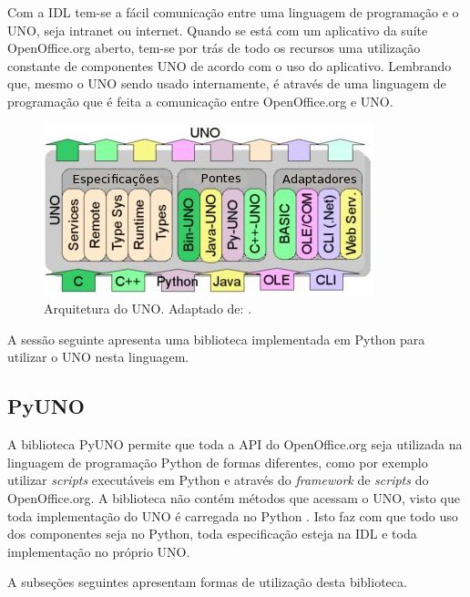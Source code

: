 Com a IDL tem-se a fácil comunicação entre uma linguagem de programação e o UNO, seja intranet ou internet. Quando se está com um aplicativo da suíte OpenOffice.org aberto, tem-se por trás de todo os recursos uma utilização constante de componentes UNO de acordo com o uso do aplicativo. Lembrando que, mesmo o UNO sendo usado internamente, é através de uma linguagem de programação que é feita a comunicação entre OpenOffice.org e UNO.

\begin{figure}[ht]
\centering
\includegraphics[scale=0.55,bb=0 0 510 180]{Uno-Arc.png}
\caption{Arquitetura do UNO. Adaptado de: \cite{uno_page}.}
\label{fig:uno_picture}
\end{figure}

A sessão seguinte apresenta uma biblioteca implementada em Python para utilizar o UNO nesta linguagem.

\subsection{PyUNO}
A biblioteca PyUNO permite que toda a API do OpenOffice.org seja utilizada na linguagem de programação Python de formas diferentes, como por exemplo utilizar \textit{scripts} executáveis em Python e através do \textit{framework} de \textit{scripts} do OpenOffice.org. A biblioteca não contém métodos que acessam o UNO, visto que toda implementação do UNO é carregada no Python \cite{pyuno_page}. Isto faz com que todo uso dos componentes seja no Python, toda especificação esteja na IDL e toda implementação no próprio UNO.

A subseções seguintes apresentam formas de utilização desta biblioteca.

